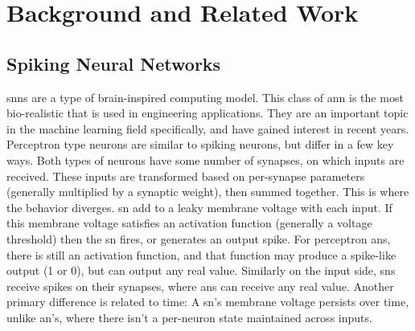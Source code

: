 %
%


\chapter{Background and Related Work}\label{chapter:background}
    \section{Spiking Neural Networks}
    \glspl{snn} are a type of brain-inspired computing model. This class of
    \gls{ann} is the most bio-realistic that is used in engineering
    applications. They are an important topic in the machine learning field
    specifically, and have gained interest in recent years. Perceptron type
    neurons are similar to spiking neurons, but differ in a few key ways. Both
    types of neurons have some number of synapses, on which inputs are
    received. These inputs are transformed based on per-synapse parameters
    (generally multiplied by a synaptic weight), then summed together. This is
    where the behavior diverges. \Gls{sn} add to a leaky membrane voltage with
    each input. If this membrane voltage satisfies an activation function
    (generally a voltage threshold) then the \gls{sn} fires, or generates an
    output spike. For perceptron \glspl{an}, there is still an activation
    function, and that function may produce a spike-like output (1 or 0), but
    can output any real value. Similarly on the input side, \glspl{sn} receive
    spikes on their synapses, where \glspl{an} can receive any real
    value. Another primary difference is related to time: A \gls{sn}'s membrane
    voltage persists over time, unlike \gls{an}'s, where there isn't a
    per-neuron state maintained across inputs.
    
